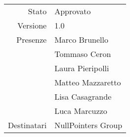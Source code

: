 \begin{center}
\begin{tabular}{r|l}
	Stato & Approvato \\
	Versione & 1.0 \\
	Presenze & Marco Brunello \\
	         & Tommaso Ceron \\
	         & Laura Pieripolli \\
	         & Matteo Mazzaretto \\
	         & Lisa Casagrande \\
	         & Luca Marcuzzo \\
	Destinatari & NullPointers Group \\
\end{tabular}
\end{center}